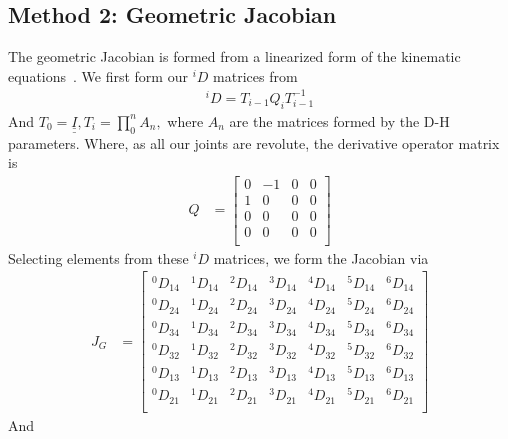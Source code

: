 \documentclass{article}
\def\du#1{\underline{\underline{#1}}}
\begin{document}
\subsection{Method 2: Geometric Jacobian}
The geometric Jacobian is formed from a linearized form of the kinematic equations~\cite{mae225_notes}.
We first form our $^i D$ matrices from
\begin{align*}
^i D = T_{i-1} Q_i T_{i-1}^{-1}
\end{align*}
And $T_{0}= \du{I}, T_{i} = \prod_0^n A_n,$ where $A_n$ are the matrices formed by the D-H parameters.
Where, as all our joints are revolute, the derivative operator matrix is
\begin{align*}
Q &=
\left[\begin{matrix}
    0 & -1 & 0 & 0 \\
    1 &  0 & 0 & 0 \\
    0 &  0 & 0 & 0 \\
    0 &  0 & 0 & 0 \\
\end{matrix}\right]
\end{align*}
Selecting elements from these $^i D$ matrices, we form the Jacobian via
\begin{align*}
J_G &=
\left[\begin{matrix}
^0D_{14} & ^1D_{14} & ^2D_{14} & ^3D_{14} & ^4D_{14} & ^5D_{14} & ^6D_{14} \\
^0D_{24} & ^1D_{24} & ^2D_{24} & ^3D_{24} & ^4D_{24} & ^5D_{24} & ^6D_{24} \\
^0D_{34} & ^1D_{34} & ^2D_{34} & ^3D_{34} & ^4D_{34} & ^5D_{34} & ^6D_{34} \\
^0D_{32} & ^1D_{32} & ^2D_{32} & ^3D_{32} & ^4D_{32} & ^5D_{32} & ^6D_{32} \\
^0D_{13} & ^1D_{13} & ^2D_{13} & ^3D_{13} & ^4D_{13} & ^5D_{13} & ^6D_{13} \\
^0D_{21} & ^1D_{21} & ^2D_{21} & ^3D_{21} & ^4D_{21} & ^5D_{21} & ^6D_{21} \\
\end{matrix}\right]
\end{align*}
And
\end{document}
